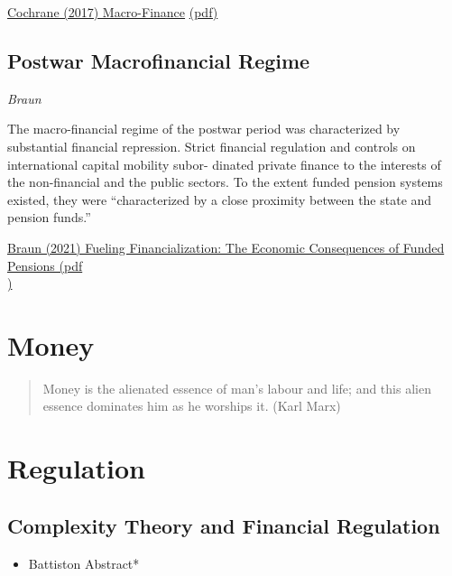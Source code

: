 \documentclass[
]{book}
\providecommand{\tightlist}{%
  \setlength{\itemsep}{0pt}\setlength{\parskip}{0pt}}
\begin{document}
\href{https://academic.oup.com/rof/article/21/3/945/3060346}{Cochrane (2017) Macro-Finance}
\href{pdf/Cochrane_2017_Macro-Finance.pdf}{(pdf)}

\hypertarget{postwar-macrofinancial-regime}{%
\section{Postwar Macrofinancial Regime}\label{postwar-macrofinancial-regime}}

\emph{Braun}

The macro-financial regime of the postwar
period was characterized by substantial financial
repression. Strict financial regulation and
controls on international capital mobility subor-
dinated private finance to the interests of the
non-financial and the public sectors. To the
extent funded pension systems existed, they
were ``characterized by a close proximity
between the state and pension funds.''

\href{pdf/Braun_2021_Fueling_Financialization_Funded_Pensions.pdf}{Braun (2021) Fueling Financialization: The Economic Consequences of Funded Pensions (pdf\\
)}

\hypertarget{money-1}{%
\chapter{Money}\label{money-1}}

\begin{quote}
Money is the alienated essence of man's labour and life; and this alien essence dominates him as he worships it. (Karl Marx)
\end{quote}

\hypertarget{regulation}{%
\chapter{Regulation}\label{regulation}}

\hypertarget{complexity-theory-and-financial-regulation}{%
\section{Complexity Theory and Financial Regulation}\label{complexity-theory-and-financial-regulation}}

\begin{itemize}
\tightlist
\item
  Battiston Abstract*
\end{itemize}
\end{document}
